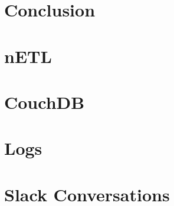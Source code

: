 \documentclass[
    parskip=full,
    a4paper
]{report}
\begin{document}
\chapter{Conclusion}



\newpage




\begin{appendices}
    \chapter{nETL}
    
    
    \chapter{CouchDB}
    
    \chapter{Logs}
    
    \chapter{Slack Conversations}
    
    \newpage
    \listoffigures
    \newpage
    \listoftables
    \newpage

\end{appendices}

\end{document}
